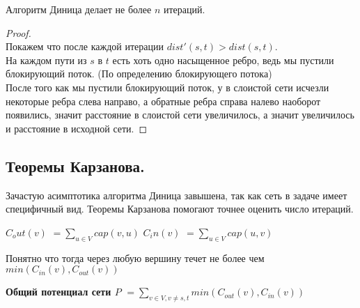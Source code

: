 \begin{prop}
	Алгоритм Диница делает не более $n$	итераций.
\end{prop}

\begin{proof} \ \\
	Покажем что после каждой итерации $dist'(s, t) > dist(s, t)$. \\
	На каждом пути из $s$ в  $t$ есть хоть одно насыщенное ребро, ведь мы пустили блокирующий поток. (По определению блокирующего потока) \\
	После того как мы пустили блокирующий поток, у в слоистой сети исчезли некоторые ребра слева направо, а обратные ребра справа налево наоборот появились, значит расстояние в слоистой сети увеличилось, а значит увеличилось и расстояние в исходной сети.
\end{proof}


\subsection{Теоремы Карзанова.}%
\label{sub:Теоремы Карзанова.}

Зачастую асимптотика алгоритма Диница завышена, так как сеть в задаче имеет специфичный вид. Теоремы Карзанова помогают точнее оценить число итераций.

\begin{Def}
	\textbf{$C_out(v)$} $= \sum\limits_{u \in V} cap(v, u)$
	\textbf{$C_in(v)$} $= \sum\limits_{u \in V} cap(u, v)$
\end{Def}

\begin{note}
	Понятно что тогда через любую вершину течет не более чем $min(C_{in}(v), C_{out}(v))$
\end{note}

\begin{Def}
	\textbf{Общий потенциал сети $P$} $= \sum\limits_{v \in V, v \neq s, t} min(C_{out}(v), C_{in}(v))$
\end{Def}

